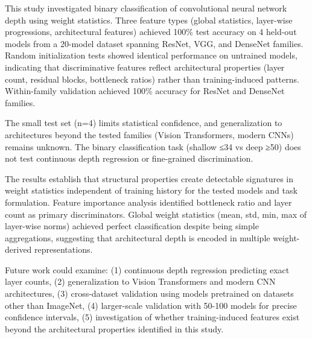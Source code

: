 
This study investigated binary classification of convolutional neural network depth using weight statistics. Three feature types (global statistics, layer-wise progressions, architectural features) achieved 100\% test accuracy on 4 held-out models from a 20-model dataset spanning ResNet, VGG, and DenseNet families. Random initialization tests showed identical performance on untrained models, indicating that discriminative features reflect architectural properties (layer count, residual blocks, bottleneck ratios) rather than training-induced patterns. Within-family validation achieved 100\% accuracy for ResNet and DenseNet families.

The small test set (n=4) limits statistical confidence, and generalization to architectures beyond the tested families (Vision Transformers, modern CNNs) remains unknown. The binary classification task (shallow ≤34 vs deep ≥50) does not test continuous depth regression or fine-grained discrimination.

The results establish that structural properties create detectable signatures in weight statistics independent of training history for the tested models and task formulation. Feature importance analysis identified bottleneck ratio and layer count as primary discriminators. Global weight statistics (mean, std, min, max of layer-wise norms) achieved perfect classification despite being simple aggregations, suggesting that architectural depth is encoded in multiple weight-derived representations.

Future work could examine: (1) continuous depth regression predicting exact layer counts, (2) generalization to Vision Transformers and modern CNN architectures, (3) cross-dataset validation using models pretrained on datasets other than ImageNet, (4) larger-scale validation with 50-100 models for precise confidence intervals, (5) investigation of whether training-induced features exist beyond the architectural properties identified in this study.
